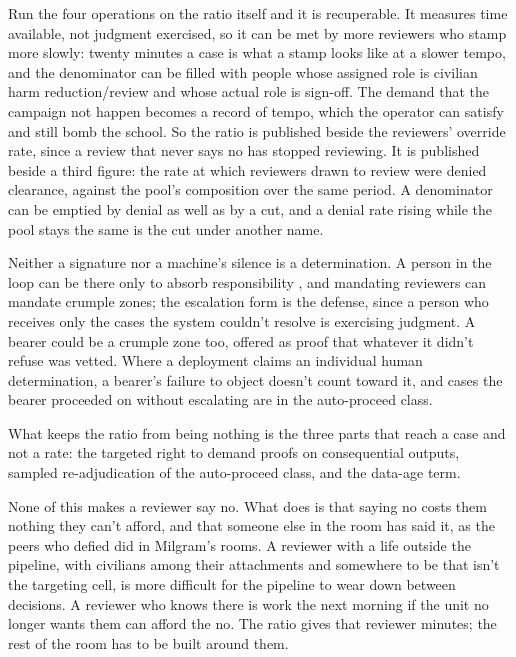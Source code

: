 Run the four operations on the ratio itself and it is recuperable. It measures time available, not judgment exercised, so it can be met by more reviewers who stamp more slowly: twenty minutes a case is what a stamp looks like at a slower tempo, and the denominator can be filled with people whose assigned role is civilian harm reduction/review and whose actual role is sign-off. The demand that the campaign not happen becomes a record of tempo, which the operator can satisfy and still bomb the school. So the ratio is published beside the reviewers' override rate, since a review that never says no has stopped reviewing.
It is published beside a third figure: the rate at which reviewers drawn to review were denied clearance, against the pool's composition over the same period. A denominator can be emptied by denial as well as by a cut, and a denial rate rising while the pool stays the same is the cut under another name.

Neither a signature nor a machine's silence is a determination. A person in the loop can be there only to absorb responsibility \autocite{Elish2019CrumpleZones}, and mandating reviewers can mandate crumple zones; the escalation form is the defense, since a person who receives only the cases the system couldn't resolve is exercising judgment. A bearer could be a crumple zone too, offered as proof that whatever it didn't refuse was vetted. Where a deployment claims an individual human determination, a bearer's failure to object doesn't count toward it, and cases the bearer proceeded on without escalating are in the auto-proceed class.

What keeps the ratio from being nothing is the three parts that reach a case and not a rate: the targeted right to demand proofs on consequential outputs, sampled re-adjudication of the auto-proceed class, and the data-age term.

None of this makes a reviewer say no. What does is that saying no costs them nothing they can't afford, and that someone else in the room has said it, as the peers who defied did in Milgram's rooms. A reviewer with a life outside the pipeline, with civilians among their attachments and somewhere to be that isn't the targeting cell, is more difficult for the pipeline to wear down between decisions. A reviewer who knows there is work the next morning if the unit no longer wants them can afford the no. The ratio gives that reviewer minutes; the rest of the room has to be built around them.
